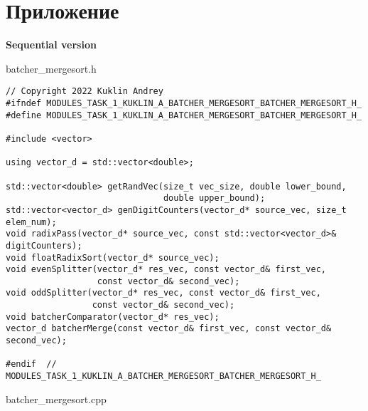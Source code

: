 \documentclass{report}
\begin{document}
\section*{Приложение}
\textbf{Sequential version}
\par batcher\_mergesort.h
\begin{lstlisting}
// Copyright 2022 Kuklin Andrey
#ifndef MODULES_TASK_1_KUKLIN_A_BATCHER_MERGESORT_BATCHER_MERGESORT_H_
#define MODULES_TASK_1_KUKLIN_A_BATCHER_MERGESORT_BATCHER_MERGESORT_H_

#include <vector>

using vector_d = std::vector<double>;

std::vector<double> getRandVec(size_t vec_size, double lower_bound,
                               double upper_bound);
std::vector<vector_d> genDigitCounters(vector_d* source_vec, size_t elem_num);
void radixPass(vector_d* source_vec, const std::vector<vector_d>& digitCounters);
void floatRadixSort(vector_d* source_vec);
void evenSplitter(vector_d* res_vec, const vector_d& first_vec,
                  const vector_d& second_vec);
void oddSplitter(vector_d* res_vec, const vector_d& first_vec,
                 const vector_d& second_vec);
void batcherComparator(vector_d* res_vec);
vector_d batcherMerge(const vector_d& first_vec, const vector_d& second_vec);

#endif  // MODULES_TASK_1_KUKLIN_A_BATCHER_MERGESORT_BATCHER_MERGESORT_H_
\end{lstlisting}
\par batcher\_mergesort.cpp
\end{document}
